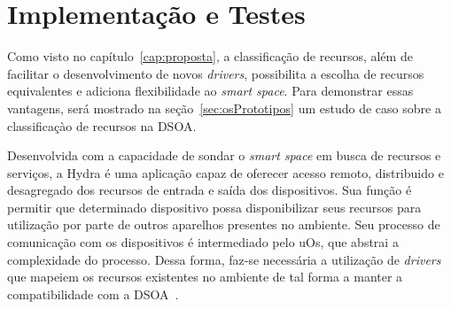 \chapter{Implementação e Testes}

Como visto no capítulo~\ref{cap:proposta}, a classificação de recursos, além de facilitar o desenvolvimento de novos \emph{drivers}, possibilita a escolha de recursos equivalentes e adiciona flexibilidade ao \emph{smart space}. Para demonstrar essas vantagens, será mostrado na seção~\ref{sec:osPrototipos} um estudo de caso sobre a classificaçào de recursos na DSOA.



Desenvolvida com a capacidade de sondar o \emph{smart space} em busca de recursos e serviços, a Hydra é uma aplicação capaz de oferecer acesso remoto, distribuido e desagregado dos recursos de entrada e saída dos dispositivos. Sua função é permitir que determinado dispositivo possa disponibilizar seus recursos para utilização por parte de outros aparelhos presentes no ambiente. Seu processo de comunicação com os dispositivos é intermediado pelo uOs, que abstrai a complexidade do processo. Dessa forma, faz-se necessária a utilização de \emph{drivers} que mapeiem os recursos existentes no ambiente de tal forma a manter a compatibilidade com a DSOA~\cite{buzeto2010, lucas2011}.

\begin{comment}
A Hydra consiste em uma aplicação construída com o objetivo de explorar a forma como o ambiente é decomposto em recursos e serviços para possibilitar uma forma desagregada de acesso a recursos de entrada e saída dos dispositivos. Seu objetivo é permitir que um determinado dispositivo tenha seus recursos de entrada e saída redirecionados para outros dispositivos, repassando a estes o controle de sua operação.

A Hydra, trabalhando sobre o middleware uOS, percebe o ambiente como um conjunto
de recursos presentes. A comunicação entre a Hydra os recursos ocorre com intermédio do
uOS, abstraindo tanto da Hydra quando dos drivers o outro ponto de comunicação. Para
os drivers, não importa para quem estão sendo prestados os serviços, e cabe à aplicação
a escolha entre os recursos do ambiente.

Por trabalhar com os conceitos da DSOA (Seção 3.1), a Hydra vê os recursos do
ambiente de forma transparente, e pode fazer uso de qualquer recurso compatível com as
interfaces por ele esperadas e permite que outros dispositivos utilizem os mesmos recursos
do ambiente.

A aplicação Hydra se propõe a reconhecer determinados drivers e redirecionar seus
serviços corretamente.
\end{comment}

